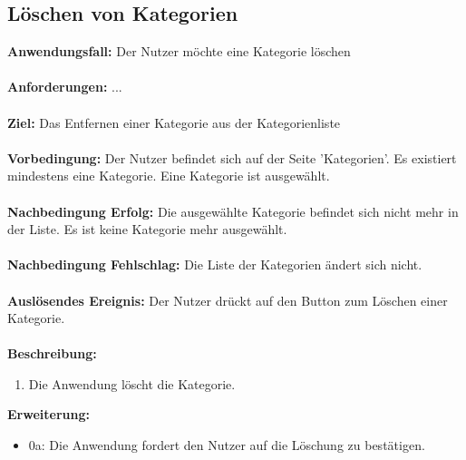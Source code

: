 \documentclass[parskip=full]{scrartcl} %
\begin{document}
\subsection*{Löschen von Kategorien}
\textbf{Anwendungsfall:} Der Nutzer möchte eine Kategorie löschen\\\\
\textbf{Anforderungen:} ...\\\\
\textbf{Ziel:} Das Entfernen einer Kategorie aus der Kategorienliste\\\\
\textbf{Vorbedingung:} Der Nutzer befindet sich auf der Seite 'Kategorien'. Es existiert mindestens eine Kategorie. Eine Kategorie ist ausgewählt.\\\\
\textbf{Nachbedingung Erfolg:} Die ausgewählte Kategorie befindet sich nicht mehr in der Liste. Es ist keine Kategorie mehr ausgewählt.\\\\
\textbf{Nachbedingung Fehlschlag:} Die Liste der Kategorien ändert sich nicht.\\\\
\textbf{Auslösendes Ereignis:} Der Nutzer drückt auf den Button zum Löschen einer Kategorie. \\\\
\textbf{Beschreibung:}
\begin{enumerate}
    \item Die Anwendung löscht die Kategorie.
\end{enumerate}
\textbf{Erweiterung:}
\begin{itemize}
    \item 0a: Die Anwendung fordert den Nutzer auf die Löschung zu bestätigen.
\end{itemize}
\newpage
\end{document}

